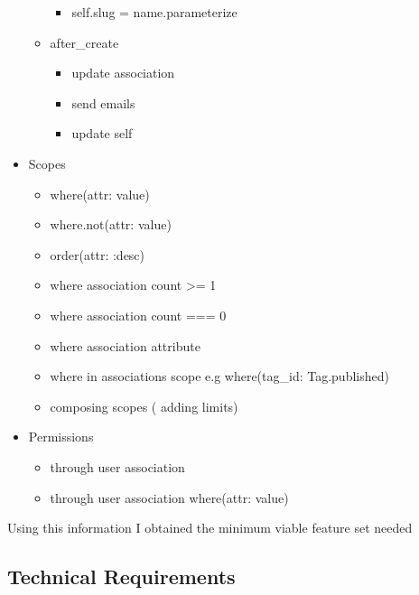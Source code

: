 \documentclass[
  12pt,
]{article}
\providecommand{\tightlist}{%
  \setlength{\itemsep}{0pt}\setlength{\parskip}{0pt}}
\begin{document}
\begin{itemize}
\begin{itemize}
    \begin{itemize}
    \tightlist
    \item
      self.slug = name.parameterize
    \end{itemize}
  \item
    after\_create

    \begin{itemize}
    \tightlist
    \item
      update association
    \item
      send emails
    \item
      update self
    \end{itemize}
  \end{itemize}
\item
  Scopes

  \begin{itemize}
  \tightlist
  \item
    where(attr: value)
  \item
    where.not(attr: value)
  \item
    order(attr: :desc)
  \item
    where association count \textgreater= 1
  \item
    where association count === 0
  \item
    where association attribute
  \item
    where in associations scope e.g where(tag\_id: Tag.published)
  \item
    composing scopes ( adding limits)
  \end{itemize}
\item
  Permissions

  \begin{itemize}
  \tightlist
  \item
    through user association
  \item
    through user association \textbar{} where(attr: value)
  \end{itemize}
\end{itemize}

Using this information I obtained the minimum viable feature set needed

\hypertarget{technical-requirements}{%
\subsection{Technical Requirements}\label{technical-requirements}}
\end{document}
